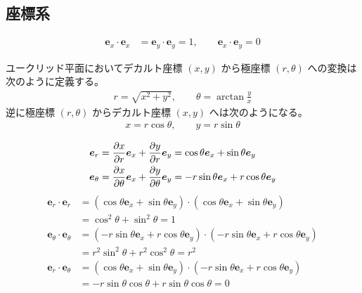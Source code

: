 \documentclass[uplatex,dvipdfmx,a4paper,11pt]{jlreq}
\newcommand{\ee}{\bm{e}}
\theoremstyle{definition}
\begin{document}
\subsection{座標系}
\begin{definition}[デカルト座標]

  \begin{align}
    \ee_x\cdot\ee_x & = \ee_y\cdot\ee_y = 1, \qquad \ee_x\cdot\ee_y = 0
  \end{align}
\end{definition}

\begin{definition}[極座標]
  ユークリッド平面においてデカルト座標 $(x, y)$ から極座標 $(r, \theta)$ への変換は次のように定義する。
  \begin{align}
    r = \sqrt{x^2 + y^2}, \qquad \theta = \arctan\frac{y}{x}
  \end{align}
  逆に極座標 $(r, \theta)$ からデカルト座標 $(x, y)$ へは次のようになる。
  \begin{align}
    x = r\cos\theta, \qquad y = r\sin\theta
  \end{align}
\end{definition}

\begin{align}
  \ee_r      & = \diffp{x}{r}\ee_x + \diffp{y}{r}\ee_y = \cos\theta\ee_x + \sin\theta\ee_y              \\
  \ee_\theta & = \diffp{x}{\theta}\ee_x + \diffp{y}{\theta}\ee_y = -r\sin\theta\ee_x + r\cos\theta\ee_y
\end{align}
\begin{align}
  \ee_r\cdot\ee_r           & = (\cos\theta\ee_x + \sin\theta\ee_y)\cdot(\cos\theta\ee_x + \sin\theta\ee_y)       \\
                            & = \cos^2\theta + \sin^2\theta = 1                                                   \\
  \ee_\theta\cdot\ee_\theta & = (-r\sin\theta\ee_x + r\cos\theta\ee_y)\cdot(-r\sin\theta\ee_x + r\cos\theta\ee_y) \\
                            & = r^2\sin^2\theta + r^2\cos^2\theta = r^2                                           \\
  \ee_r\cdot\ee_\theta      & = (\cos\theta\ee_x + \sin\theta\ee_y)\cdot(-r\sin\theta\ee_x + r\cos\theta\ee_y)    \\
                            & = -r\sin\theta\cos\theta + r\sin\theta\cos\theta = 0
\end{align}
\end{document}
